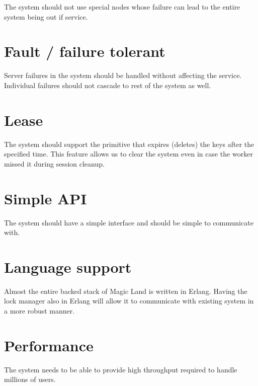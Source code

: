 The system should not use special nodes whose failure can lead to the
entire system being out if service.

\section{Fault / failure tolerant}


Server failures in the system should be handled without affecting the service.
Individual failures should not cascade to rest of the system as well.

\section{Lease}


The system should support the primitive that expires (deletes) the keys after
the specified time. This feature allows us to clear the system even in case
the worker missed it during session cleanup.

\section{Simple API}


The system should have a simple interface and should be simple to communicate
with.

\section{Language support}


Almost the entire backed stack of Magic Land is written in Erlang. Having the
lock manager also in Erlang will allow it to communicate with existing
system in a more robust manner.

\section{Performance}


The system needs to be able to provide high throughput required to handle
millions of users.

